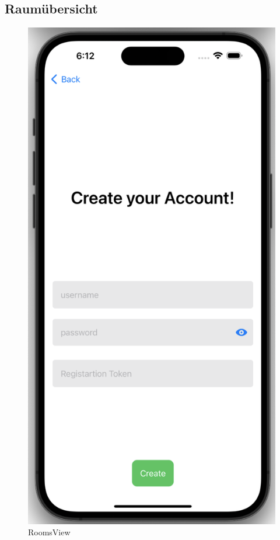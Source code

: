     \newpage
    \subsection{Raumübersicht}

    \begin{figure}[h]
        \includegraphics[scale=0.5]{accountcreate}
        \centering
        \caption{RoomsView}\label{fig:roomsview}
    \end{figure}

